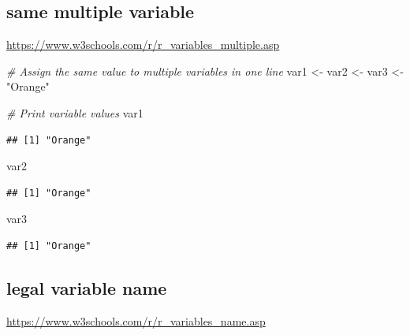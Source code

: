 \documentclass[
]{book}
\newenvironment{Shaded}{\begin{snugshade}}{\end{snugshade}}
\newcommand{\CommentTok}[1]{\textcolor[rgb]{0.56,0.35,0.01}{\textit{#1}}}
\newcommand{\NormalTok}[1]{#1}
\newcommand{\OtherTok}[1]{\textcolor[rgb]{0.56,0.35,0.01}{#1}}
\newcommand{\StringTok}[1]{\textcolor[rgb]{0.31,0.60,0.02}{#1}}
\theoremstyle{definition}
\theoremstyle{definition}
\theoremstyle{definition}
\theoremstyle{definition}
\theoremstyle{remark}
\begin{document}
\hypertarget{same-multiple-variable}{%
\subsection{same multiple variable}\label{same-multiple-variable}}

\url{https://www.w3schools.com/r/r_variables_multiple.asp}

\begin{Shaded}
\begin{Highlighting}[]
\CommentTok{\# Assign the same value to multiple variables in one line}
\NormalTok{var1 }\OtherTok{\textless{}{-}}\NormalTok{ var2 }\OtherTok{\textless{}{-}}\NormalTok{ var3 }\OtherTok{\textless{}{-}} \StringTok{"Orange"}

\CommentTok{\# Print variable values}
\NormalTok{var1}
\end{Highlighting}
\end{Shaded}

\begin{verbatim}
## [1] "Orange"
\end{verbatim}

\begin{Shaded}
\begin{Highlighting}[]
\NormalTok{var2}
\end{Highlighting}
\end{Shaded}

\begin{verbatim}
## [1] "Orange"
\end{verbatim}

\begin{Shaded}
\begin{Highlighting}[]
\NormalTok{var3}
\end{Highlighting}
\end{Shaded}

\begin{verbatim}
## [1] "Orange"
\end{verbatim}

\hypertarget{legal-variable-name}{%
\subsection{legal variable name}\label{legal-variable-name}}

\url{https://www.w3schools.com/r/r_variables_name.asp}
\end{document}
